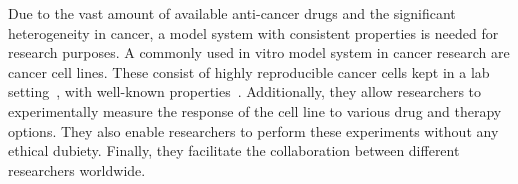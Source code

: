 Due to the vast amount of available anti-cancer drugs and the significant heterogeneity in cancer, a model system with consistent properties is needed for research purposes.
A commonly used in vitro model system in cancer research are cancer cell lines.
These consist of highly reproducible cancer cells kept in a lab setting~\cite{cancer_cell_lines_useful_model}, with well-known properties~\cite{cancer_cell_line_definition,cancer_cell_lines_useful_model}.
Additionally, they allow researchers to experimentally measure the response of the cell line to various drug and therapy options.
They also enable researchers to perform these experiments without any ethical dubiety.
Finally, they facilitate the collaboration between different researchers worldwide.

